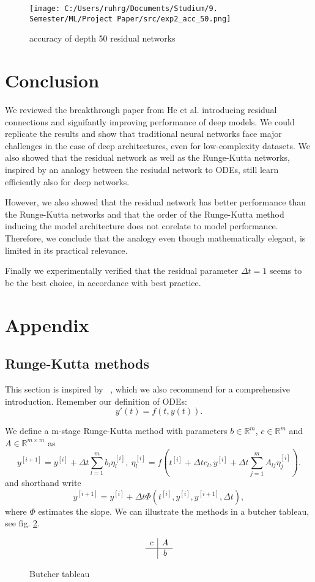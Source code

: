 \documentclass{article}
\begin{document}
\begin{figure}[h!]
    \centering
    \texttt{[image: C:/Users/ruhrg/Documents/Studium/9. Semester/ML/Project Paper/src/exp2\_acc\_50.png]}
    \caption{accuracy of depth 50 residual networks}
    \label{fig5}
\end{figure}

\section{Conclusion}
We reviewed the breakthrough paper from He et al. introducing residual connections and signifantly improving performance of deep models. We could replicate the results and show that traditional neural networks face major challenges in the case of deep architectures, even for low-complexity datasets. We also showed that the residual network as well as the Runge-Kutta networks, inspired by an analogy between the resiudal network to ODEs, still learn efficiently also for deep networks.

However, we also showed that the residual network has better performance than the Runge-Kutta networks and that the order of the Runge-Kutta method inducing the model architecture does not corelate to model performance. Therefore, we conclude that the analogy even though mathematically elegant, is limited in its practical relevance.

Finally we experimentally verified that the residual parameter $\Delta t = 1$ seems to be the best choice, in accordance with best practice.



\appendix
\section{Appendix} 
\subsection{Runge-Kutta methods} \label{app1}
This section is inspired by ~\citep{rannacher2017numerik}, which we also recommend for a comprehensive introduction. Remember our definition of ODEs:
$$
y'(t) = f(t, y(t)).
$$

We define a m-stage Runge-Kutta method with parameters $b \in \mathbb{R}^m$, $c \in \mathbb{R}^m$ and $A \in \mathbb{R}^{m \times m}$ as
$$
y^{[i+1]} = y^{[i]} + \Delta t \sum_{l=1}^{m} b_{l} \eta_{l}^{[i]}, \
\eta_{l}^{[i]} = f(t^{[i]} + \Delta t c_{l}, y^{[i]} + \Delta t \sum_{j=1}^{m} A_{lj} \eta_{j}^{[i]}).
$$
and shorthand write
$$
y^{[i+1]} = y^{[i]} + \Delta t \Phi(t^{[i]}, y^{[i]}, y^{[i+1]}, \Delta t),
$$
where $\Phi$ estimates the slope. We can illustrate the methods in a butcher tableau, see fig. \ref{figA2}. 
\begin{figure}[h]
\centering
\[
\begin{array}
{c|c}
c & A \\
\hline
& b
\end{array}
\]
\caption{Butcher tableau}
\label{figA2}
\end{figure}
\end{document}
